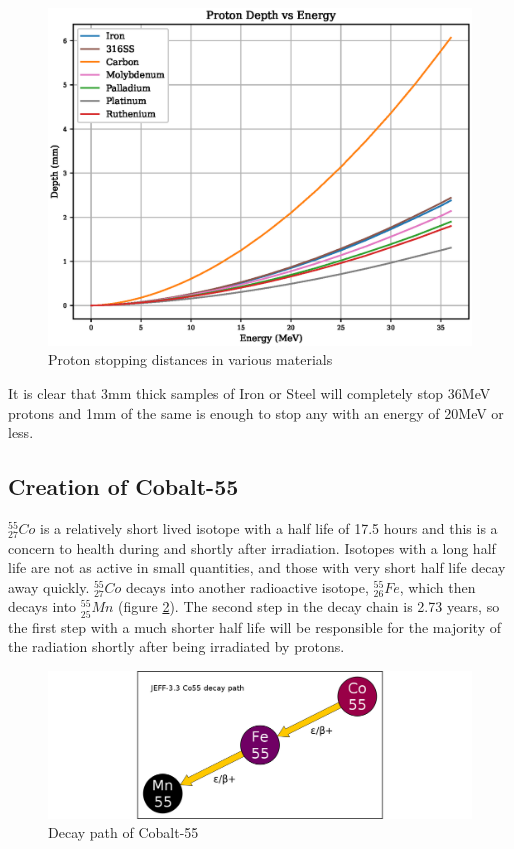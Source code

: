 \FloatBarrier
\begin{figure}[h]
  \begin{center}
    \includegraphics[width=0.7\linewidth]{chapters/activity_code/proton_stopping.eps}
    \caption{Proton stopping distances in various materials}
    \label{fig:stoppingdistanceprotons}
  \end{center}
\end{figure}

It is clear that 3mm thick samples of Iron or Steel will completely stop 36MeV protons and 1mm of the same is enough to stop any with an energy of 20MeV or less.


\subsection{Creation of Cobalt-55}

${}^{55}_{27} Co$ is a relatively short lived isotope with a half life of 17.5 hours and this is a concern to health during and shortly after irradiation.  Isotopes with a long half life are not as active in small quantities, and those with very short half life decay away quickly.  ${}^{55}_{27} Co$ decays into another radioactive isotope, ${}^{55}_{26} Fe$, which then decays into ${}^{55}_{25} Mn$ (figure \ref{fig:DecayPathCo55}).  The second step in the decay chain is 2.73 years, so the first step with a much shorter half life will be responsible for the majority of the radiation shortly after being irradiated by protons.

\FloatBarrier
\begin{figure}[h]
  \begin{center}
    \includegraphics[width=0.5\linewidth]{chapters/activity_code/fe-co55/Co55_decay_path.png}
    \caption{Decay path of Cobalt-55}
    \label{fig:DecayPathCo55}
  \end{center}
\end{figure}


